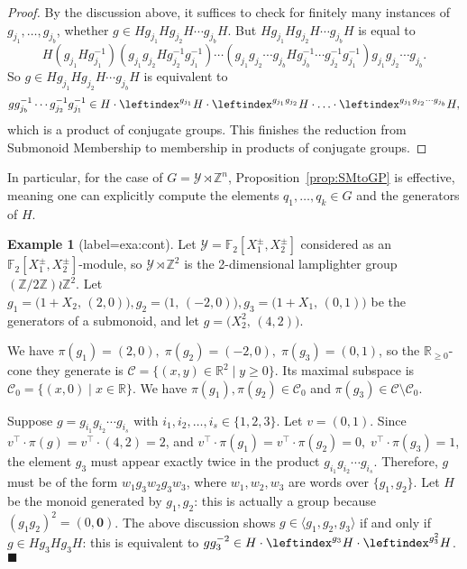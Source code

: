 \documentclass[a4paper,UKenglish,cleveref, autoref, thm-restate]{lipics-v2021}
\newcommand{\Z}{\mathbb{Z}}
\newcommand{\R}{\mathbb{R}}
\newcommand{\F}{\mathbb{F}}
\newcommand{\mC}{\mathcal{C}}
\newcommand{\mY}{\mathcal{Y}}
\newcommand{\bzer}{\boldsymbol{0}}
\newcommand{\gen}[1]{\langle {#1} \rangle}
\theoremstyle{definition}
\theoremstyle{definition}
\newtheorem{exmpl}[thrm]{Example}
\theoremstyle{definition}
\begin{document}
\begin{proof}
    By the discussion above, it suffices to check for finitely many instances of $g_{j_1}, \ldots, g_{j_b}$, whether $g \in H g_{j_1} H g_{j_2} H \cdots g_{j_b} H$.
    But $H g_{j_1} H g_{j_2} H \cdots g_{j_b} H$ is equal to
    \[
    H (g_{j_1} H g_{j_1}^{-1}) (g_{j_1} g_{j_2} H g_{j_2}^{-1} g_{j_1}^{-1}) \cdots (g_{j_1} g_{j_2} \cdots g_{j_b} H g_{j_b}^{-1} \cdots g_{j_2}^{-1} g_{j_1}^{-1}) g_{j_1} g_{j_2} \cdots g_{j_b}.
    \]
    So $g \in H g_{j_1} H g_{j_2} H \cdots g_{j_b} H$ is equivalent to
    \[
    g g_{j_b}^{-1} \cdots g_{j_2}^{-1} g_{j_1}^{-1} \in H \cdot \leftindex^{g_{j_1}}{H} \cdot \leftindex^{g_{j_1} g_{j_2}}{H} \cdot \ldots \cdot \leftindex^{g_{j_1} g_{j_2} \cdots g_{j_b}}{H},
    \]
    which is a product of conjugate groups.
    This finishes the reduction from Submonoid Membership to membership in products of conjugate groups.
\end{proof}

In particular, for the case of $G =  \mY \rtimes \Z^n$, Proposition~\ref{prop:SMtoGP} is effective, meaning one can explicitly compute the elements $q_1, \ldots, q_k \in G$ and the generators of $H$.

\begin{exmpl}[label=exa:cont]\label{expl:running}
Let $\mY = \F_2[X_1^{\pm}, X_2^{\pm}]$ considered as an $\F_2[X_1^{\pm}, X_2^{\pm}]$-module, so $\mY \rtimes \Z^2$ is the 2-dimensional lamplighter group $(\Z/2\Z) \wr \Z^2$.
Let $g_1 = \big(1 + X_2, \, (2, 0)\big), g_2 = \big(1, \, (- 2, 0)\big), g_3 = \big(1 + X_1, \, (0, 1)\big)$ be the generators of a submonoid, and let $g = \big(X_2^2, \, (4, 2)\big)$.

We have $\pi(g_1) = (2, 0), \; \pi(g_2) = (-2, 0), \; \pi(g_3) = (0, 1)$, so the $\R_{\geq 0}$-cone they generate is $\mC = \{(x, y) \in \R^2 \mid y \geq 0\}$.
Its maximal subspace is $\mC_0 = \{(x, 0) \mid x \in \R\}$.
We have $\pi(g_1), \pi(g_2) \in \mC_0$ and $\pi(g_3) \in \mC \setminus \mC_0$.

Suppose $g = g_{i_1} g_{i_2} \cdots g_{i_s}$ with $i_1, i_2, \ldots, i_s \in \{1, 2, 3\}$.
Let $v = (0, 1)$.
Since $v^{\top} \cdot \pi(g) = v^{\top} \cdot (4, 2) = 2$, and $v^{\top} \cdot \pi(g_1) = v^{\top} \cdot \pi(g_2) = 0, \; v^{\top} \cdot \pi(g_3) = 1$, the element $g_3$ must appear exactly twice in the product $g_{i_1} g_{i_2} \cdots g_{i_s}$.
Therefore, $g$ must be of the form $w_1 g_3 w_2 g_3 w_3$, where $w_1, w_2, w_3$ are words over $\{g_1, g_2\}$.
Let $H$ be the monoid generated by $g_1, g_2$: this is actually a group because $(g_1 g_2)^2 = (0, \bzer)$.
The above discussion shows $g \in \gen{g_1, g_2, g_3}$ if and only if $g \in H g_3 H g_3 H$: this is equivalent to $g g_3^{-2} \in H \cdot \leftindex^{g_3}{H} \cdot \leftindex^{g_3^{2}}{H}$.
\hfill $\blacksquare$
\end{exmpl}
\end{document}
